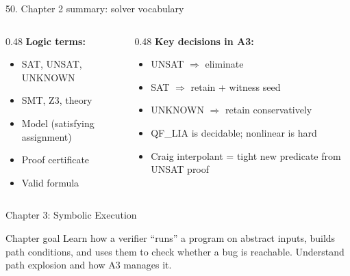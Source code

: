 \documentclass[aspectratio=169]{beamer}
\begin{document}
\begin{frame}{50. Chapter 2 summary: solver vocabulary}
\begin{columns}
\begin{column}{0.48\textwidth}
\textbf{Logic terms:}
\begin{itemize}
  \item SAT, UNSAT, UNKNOWN
  \item SMT, Z3, theory
  \item Model (satisfying assignment)
  \item Proof certificate
  \item Valid formula
\end{itemize}
\end{column}
\begin{column}{0.48\textwidth}
\textbf{Key decisions in A3:}
\begin{itemize}
  \item UNSAT $\Rightarrow$ eliminate
  \item SAT $\Rightarrow$ retain + witness seed
  \item UNKNOWN $\Rightarrow$ retain conservatively
  \item QF\_LIA is decidable; nonlinear is hard
  \item Craig interpolant = tight new predicate from UNSAT proof
\end{itemize}
\end{column}
\end{columns}
\end{frame}


\begin{frame}{Chapter 3: Symbolic Execution}
\begin{block}{Chapter goal}
Learn how a verifier ``runs'' a program on abstract inputs, builds path conditions, and uses them
to check whether a bug is reachable. Understand path explosion and how A3 manages it.
\end{block}
\end{frame}
\end{document}
